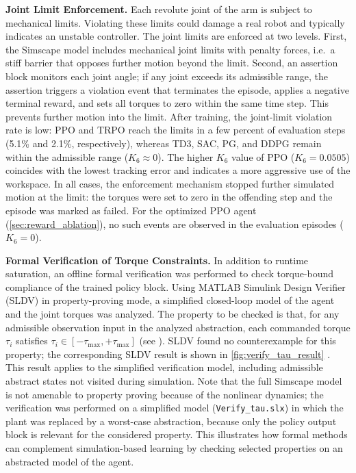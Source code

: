 \documentclass{ieeeaccess}
\begin{document}
\textbf{Joint Limit Enforcement.} Each revolute joint of the arm is subject to mechanical limits. Violating these limits could damage a real robot and typically indicates an unstable controller. The joint limits are enforced at two levels. First, the Simscape model includes mechanical joint limits with penalty forces, i.e.\ a stiff barrier that opposes further motion beyond the limit. Second, an assertion block monitors each joint angle; if any joint exceeds its admissible range, the assertion triggers a violation event that terminates the episode, applies a negative terminal reward, and sets all torques to zero within the same time step. This prevents further motion into the limit. After training, the joint-limit violation rate is low: PPO and TRPO reach the limits in a few percent of evaluation steps (5.1\% and 2.1\%, respectively), whereas TD3, SAC, PG, and DDPG remain within the admissible range ($K_6 \approx 0$). The higher $K_6$ value of PPO ($K_6 = 0.0505$) coincides with the lowest tracking error and indicates a more aggressive use of the workspace. In all cases, the enforcement mechanism stopped further simulated motion at the limit: the torques were set to zero in the offending step and the episode was marked as failed. For the optimized PPO agent (\autoref{sec:reward_ablation}), no such events are observed in the evaluation episodes ($K_6 = 0$).

\textbf{Formal Verification of Torque Constraints.} In addition to runtime saturation, an offline formal verification was performed to check torque-bound compliance of the trained policy block. Using MATLAB Simulink Design Verifier (SLDV) in property-proving mode,
a simplified closed-loop model of the agent and the joint torques was analyzed. The property to be checked is that, for any admissible observation input in the analyzed abstraction, each commanded torque $\tau_i$ satisfies $\tau_i \in [-\tau_{\max}, +\tau_{\max}]$ (see ). SLDV found no counterexample for this property; the corresponding SLDV result is shown in \autoref{fig:verify_tau_result} \cite{b5}. This result applies to the simplified verification model, including admissible abstract states not visited during simulation. Note that the full Simscape model is not amenable to property proving because of the nonlinear dynamics; the verification was performed on a simplified model (\texttt{Verify\_tau.slx}) in which the plant was replaced by a worst-case abstraction, because only the policy output block is relevant for the considered property. This illustrates how formal methods can complement simulation-based learning by checking selected properties on an abstracted model of the agent.
\end{document}
